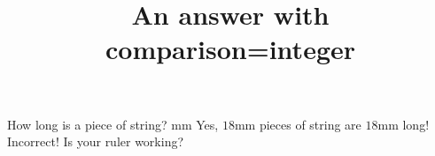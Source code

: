 \documentclass[hidesidemenu]{webquiz}
\title{An answer with comparison=integer}
\begin{document}
  \begin{question}     %
     How long is a piece of string?
      mm
     \whenRight Yes, $18$mm pieces of string are $18$mm long!
     \whenWrong Incorrect! Is your ruler working?
  \end{question}
\end{document}
